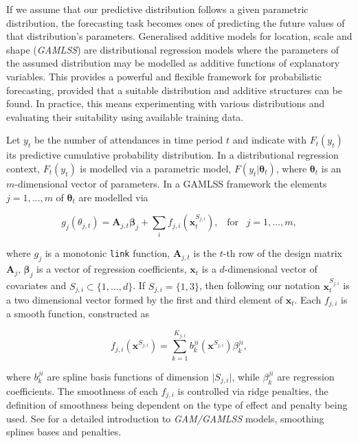 \documentclass[]{elsarticle} %
\begin{document}
If we assume that our predictive distribution follows a given parametric distribution, the forecasting task becomes ones of predicting the future values of that distribution's parameters. Generalised additive models for location, scale and shape (\emph{GAMLSS}) are distributional regression models where the parameters of the assumed distribution may be modelled as additive functions of explanatory variables. This provides a powerful and flexible framework for probabilistic forecasting, provided that a suitable distribution and additive structures can be found. In practice, this means experimenting with various distributions and evaluating their suitability using available training data.

Let \(y_t\) be the number of attendances in time period \(t\) and indicate with \(F_t(y_t)\) its predictive cumulative probability distribution. In a distributional regression context, \(F_t(y_t)\) is modelled via a parametric model, \(F(y_t|\bm \theta_t)\), where \(\bm \theta_t\) is an \(m\)-dimensional vector of parameters. In a GAMLSS framework \citep{Rigby2005} the elements \(j=1,...,m\) of \(\bm \theta_t\) are modelled via

\begin{equation}
    g_j(\theta_{j,t})=\mathbf{A}_{j,t} \bm{\beta}_j + \sum_{i} f_{j,i}({\bm x}^{S_{j,i}}_t), \;\;\; \text{for} \;\;\; j = 1, \dots, m,
    \label{eq:basicGAM}
\end{equation}

where \(g_j\) is a monotonic \texttt{link} function, \(\mathbf{A}_{j,t}\) is the \(t\)-th row of the design matrix \(\mathbf{A}_j\), \(\bm \beta_j\) is a vector of regression coefficients, \(\bm x_t\) is a \(d\)-dimensional vector of covariates and \(S_{j,i} \subset \{1, \dots, d\}\). If \(S_{j,i} = \{1, 3\}\), then following our notation \({\bm x}_{t}^{S_{j,i}}\) is a two dimensional vector formed by the first and third element of \(\bm x_t\). Each \(f_{j,i}\) is a smooth function, constructed as

\begin{equation}
    f_{j,i}(\bm x^{S_{j,i}}) = \sum_{k=1}^{K_{j,i}} b^{ji}_k (\bm x^{S_{j,i}}) \beta_k^{ji},
    \label{eq:smmothfunction}
\end{equation}

where \(b^{ji}_k\) are spline basis functions of dimension \(\vert S_{j,i} \vert\), while \(\beta_k^{ji}\) are regression coefficients. The smoothness of each \(f_{j,i}\) is controlled via ridge penalties, the definition of smoothness being dependent on the type of effect and penalty being used. See \citet{Wood2017} for a detailed introduction to \emph{GAM/GAMLSS} models, smoothing splines bases and penalties.
\end{document}
